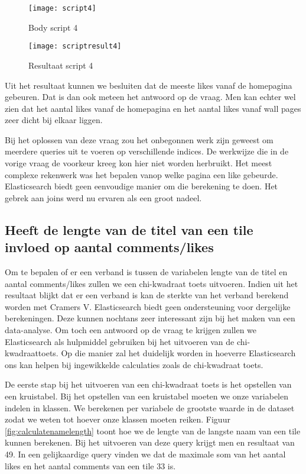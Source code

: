 \begin{figure}
	\centering
	\texttt{[image: script4]}
	\caption{Body script 4}
	\label{fig:script4}
\end{figure}

\begin{figure}
	\centering
	\texttt{[image: scriptresult4]}
	\caption{Resultaat script 4}
	\label{fig:scriptresult4}
\end{figure}

Uit het resultaat kunnen we besluiten dat de meeste likes vanaf de homepagina gebeuren. Dat is dan ook meteen het antwoord op de vraag. Men kan echter wel zien dat het aantal likes vanaf de homepagina en het aantal likes vanaf wall pages zeer dicht bij elkaar liggen. 

Bij het oplossen van deze vraag zou het onbegonnen werk zijn geweest om meerdere queries uit te voeren op verschillende indices. De werkwijze die in de vorige vraag de voorkeur kreeg kon hier niet worden herbruikt. Het meest complexe rekenwerk was het bepalen vanop welke pagina een like gebeurde. Elasticsearch biedt geen eenvoudige manier om die berekening te doen. Het gebrek aan joins werd nu ervaren als een groot nadeel.

\subsection{Heeft de lengte van de titel van een tile invloed op aantal comments/likes}

Om te bepalen of er een verband is tussen de variabelen lengte van de titel en aantal comments/likes zullen we een chi-kwadraat toets uitvoeren. Indien uit het resultaat blijkt dat er een verband is kan de sterkte van het verband berekend worden met Cramers V. Elasticsearch biedt geen ondersteuning voor dergelijke berekeningen. Deze kunnen nochtans zeer interessant zijn bij het maken van een data-analyse. Om toch een antwoord op de vraag te krijgen zullen we Elasticsearch als hulpmiddel gebruiken bij het uitvoeren van de chi-kwadraattoets. Op die manier zal het duidelijk worden in hoeverre Elasticsearch ons kan helpen bij ingewikkelde calculaties zoals de chi-kwadraat toets. 

De eerste stap bij het uitvoeren van een chi-kwadraat toets is het opstellen van een kruistabel. Bij het opstellen van een kruistabel moeten we onze variabelen indelen in klassen. We berekenen per variabele de grootste waarde in de dataset zodat we weten tot hoever onze klassen moeten reiken. Figuur \ref{fig:calculatenamelength} toont hoe we de lengte van de langste naam van een tile kunnen berekenen. Bij het uitvoeren van deze query krijgt men en resultaat van 49. In een gelijkaardige query vinden we dat de maximale som van het aantal likes en het aantal comments van een tile 33 is.

